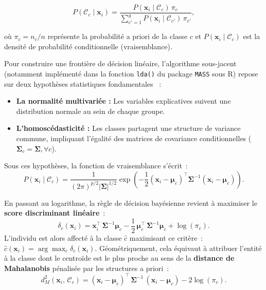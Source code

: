 \documentclass[12pt, a4paper, oneside]{report}
\begin{document}
	\begin{equation}
		P(\mathcal{C}_c \mid \mathbf{x}_i) = \frac{P(\mathbf{x}_i \mid \mathcal{C}_c)\,\pi_c}{\displaystyle\sum_{c'=1}^{g} P(\mathbf{x}_i \mid \mathcal{C}_{c'})\,\pi_{c'}},
		\label{eq:bayes}
	\end{equation}
	
	où $\pi_c = n_c / n$ représente la probabilité a priori de la classe $c$ et $P(\mathbf{x}_i \mid \mathcal{C}_c)$ est la densité de probabilité conditionnelle (vraisemblance). 
	
	Pour construire une frontière de décision linéaire, l'algorithme sous-jacent (notamment implémenté dans la fonction \texttt{lda()} du package \texttt{MASS} sous R) repose sur deux hypothèses statistiques fondamentales \cite[chap.~12]{venables2002modern}~:
	\begin{itemize}
		\item \textbf{La normalité multivariée :} Les variables explicatives suivent une distribution normale au sein de chaque groupe.
		\item \textbf{L'homoscédasticité :} Les classes partagent une structure de variance commune, impliquant l'égalité des matrices de covariance conditionnelles ($\boldsymbol{\Sigma}_c = \boldsymbol{\Sigma}, \forall c$).
	\end{itemize}
	
	Sous ces hypothèses, la fonction de vraisemblance s'écrit~:
	\begin{equation}
		P(\mathbf{x}_i \mid \mathcal{C}_c) = \frac{1}{(2\pi)^{p/2}|\boldsymbol{\Sigma}|^{1/2}} \exp\!\left( -\frac{1}{2} (\mathbf{x}_i - \boldsymbol{\mu}_c)^{\top} \boldsymbol{\Sigma}^{-1} (\mathbf{x}_i - \boldsymbol{\mu}_c) \right).
		\label{eq:vraisemblance}
	\end{equation}
	
	En passant au logarithme, la règle de décision bayésienne revient à maximiser le \textbf{score discriminant linéaire}~:
	\begin{equation}
		\delta_c(\mathbf{x}_i) = \mathbf{x}_i^{\top}\,\boldsymbol{\Sigma}^{-1}\boldsymbol{\mu}_c - \frac{1}{2}\,\boldsymbol{\mu}_c^{\top}\,\boldsymbol{\Sigma}^{-1}\boldsymbol{\mu}_c + \log(\pi_c).
		\label{eq:score_bayes}
	\end{equation}
	L'individu est alors affecté à la classe $\hat{c}$ maximisant ce critère~: $\hat{c}(\mathbf{x}_i) = \arg\max_{c} \delta_c(\mathbf{x}_i)$. Géométriquement, cela équivaut à attribuer l'entité à la classe dont le centroïde est le plus proche au sens de la \textbf{distance de Mahalanobis} pénalisée par les structures a priori~:
	\begin{equation}
		d_M^2(\mathbf{x}_i,\, \mathcal{C}_c) = (\mathbf{x}_i - \boldsymbol{\mu}_c)^{\top}\,\boldsymbol{\Sigma}^{-1}\,(\mathbf{x}_i - \boldsymbol{\mu}_c) - 2\log(\pi_c).
		\label{eq:mahalanobis}
	\end{equation}
	
\end{document}
